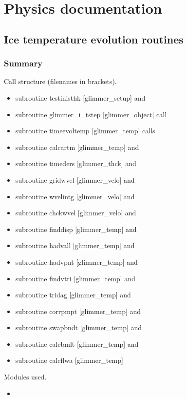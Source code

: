 
\section{Physics documentation}

\subsection{Ice temperature evolution routines}

\subsubsection{Summary}
Call structure (filenames in brackets).
\begin{itemize}
    \item subroutine testinisthk [glimmer\_setup] and
    \item subroutine glimmer\_i\_tstep [glimmer\_object] call
    \item subroutine timeevoltemp [glimmer\_temp] calls
    \item subroutine calcartm [glimmer\_temp] and
    \item subroutine timeders [glimmer\_thck] and
    \item subroutine gridwvel [glimmer\_velo] and
    \item subroutine wvelintg [glimmer\_velo] and
    \item subroutine chckwvel [glimmer\_velo] and
    \item subroutine finddisp [glimmer\_temp] and
    \item subroutine hadvall [glimmer\_temp] and
    \item subroutine hadvpnt [glimmer\_temp] and
    \item subroutine findvtri [glimmer\_temp] and
    \item subroutine tridag [glimmer\_temp] and
    \item subroutine corrpmpt [glimmer\_temp] and
    \item subroutine swapbndt [glimmer\_temp] and
    \item subroutine calcbmlt [glimmer\_temp] and
    \item subroutine calcflwa [glimmer\_temp]
\end{itemize}

\noindent Modules used.
\begin{itemize}
    \item
\end{itemize}

